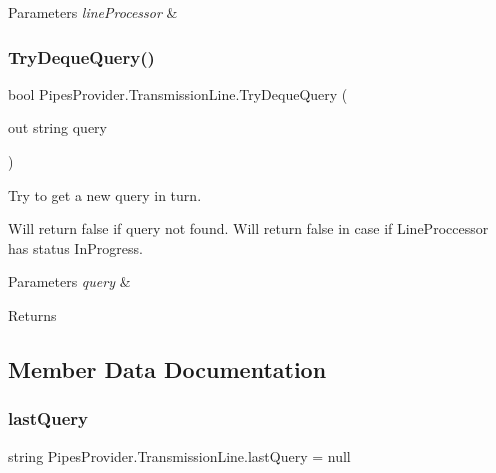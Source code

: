\begin{DoxyParams}{Parameters}
{\em line\+Processor} & \\
\hline
\end{DoxyParams}
\mbox{\label{class_pipes_provider_1_1_transmission_line_a9ab008a66866d2bdb29f4a33e563e3d1}} 
\subsubsection{\texorpdfstring{Try\+Deque\+Query()}{TryDequeQuery()}}
{\footnotesize\ttfamily bool Pipes\+Provider.\+Transmission\+Line.\+Try\+Deque\+Query (\begin{DoxyParamCaption}\item[{out string}]{query }\end{DoxyParamCaption})}



Try to get a new query in turn. 

Will return false if query not found. Will return false in case if Line\+Proccessor has status In\+Progress. 


\begin{DoxyParams}{Parameters}
{\em query} & \\
\hline
\end{DoxyParams}
\begin{DoxyReturn}{Returns}

\end{DoxyReturn}


\subsection{Member Data Documentation}
\mbox{\label{class_pipes_provider_1_1_transmission_line_aaccd1f86aa1a894f8e0b2bbb00923413}} 
\subsubsection{\texorpdfstring{last\+Query}{lastQuery}}
{\footnotesize\ttfamily string Pipes\+Provider.\+Transmission\+Line.\+last\+Query = null\hspace{0.3cm}{\ttfamily [protected]}}



